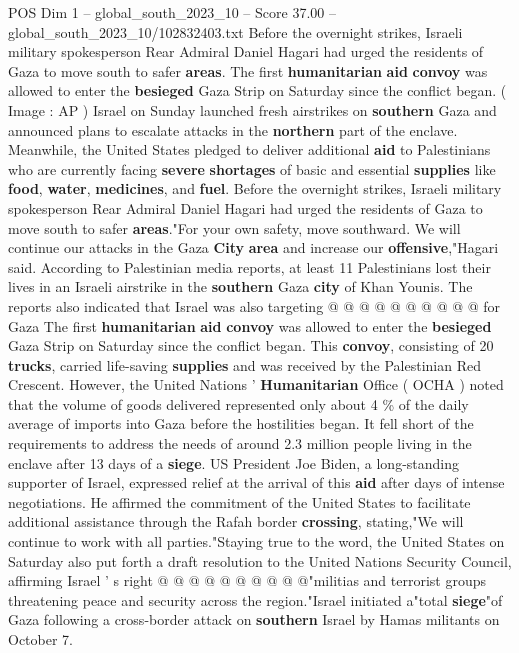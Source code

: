 \begin{textsample}{POS Dim 1 – global\_south\_2023\_10 – Score 37.00 – global\_south\_2023\_10/102832403.txt}  \label{ex:f1_pos_181}
Before the overnight strikes, Israeli military spokesperson Rear Admiral Daniel Hagari had urged the residents of Gaza to move south to safer \textbf{areas}.
The first \textbf{humanitarian} \textbf{aid} \textbf{convoy} was allowed to enter the \textbf{besieged} Gaza Strip on Saturday since the conflict began. ( Image : AP ) Israel on Sunday launched fresh airstrikes on \textbf{southern} Gaza and announced plans to escalate attacks in the \textbf{northern} part of the enclave.
Meanwhile, the United States pledged to deliver additional \textbf{aid} to Palestinians who are currently facing \textbf{severe} \textbf{shortages} of basic and essential \textbf{supplies} like \textbf{food}, \textbf{water}, \textbf{medicines}, and \textbf{fuel}.
Before the overnight strikes, Israeli military spokesperson Rear Admiral Daniel Hagari had urged the residents of Gaza to move south to safer \textbf{areas}."For your own safety, move southward.
We will continue our attacks in the Gaza \textbf{City} \textbf{area} and increase our \textbf{offensive},"Hagari said.
According to Palestinian media reports, at least 11 Palestinians lost their lives in an Israeli airstrike in the \textbf{southern} Gaza \textbf{city} of Khan Younis.
The reports also indicated that Israel was also targeting @ @ @ @ @ @ @ @ @ @ for Gaza The first \textbf{humanitarian} \textbf{aid} \textbf{convoy} was allowed to enter the \textbf{besieged} Gaza Strip on Saturday since the conflict began.
This \textbf{convoy}, consisting of 20 \textbf{trucks}, carried life-saving \textbf{supplies} and was received by the Palestinian Red Crescent.
However, the United Nations ' \textbf{Humanitarian} Office ( OCHA ) noted that the volume of goods delivered represented only about 4 \% of the daily average of imports into Gaza before the hostilities began.
It fell short of the requirements to address the needs of around 2.3 million people living in the enclave after 13 days of a \textbf{siege}.
US President Joe Biden, a long-standing supporter of Israel, expressed relief at the arrival of this \textbf{aid} after days of intense negotiations.
He affirmed the commitment of the United States to facilitate additional assistance through the Rafah border \textbf{crossing}, stating,"We will continue to work with all parties."Staying true to the word, the United States on Saturday also put forth a draft resolution to the United Nations Security Council, affirming Israel ' s right @ @ @ @ @ @ @ @ @ @"militias and terrorist groups threatening peace and security across the region."Israel initiated a"total \textbf{siege}"of Gaza following a cross-border attack on \textbf{southern} Israel by Hamas militants on October 7.

\end{textsample}
